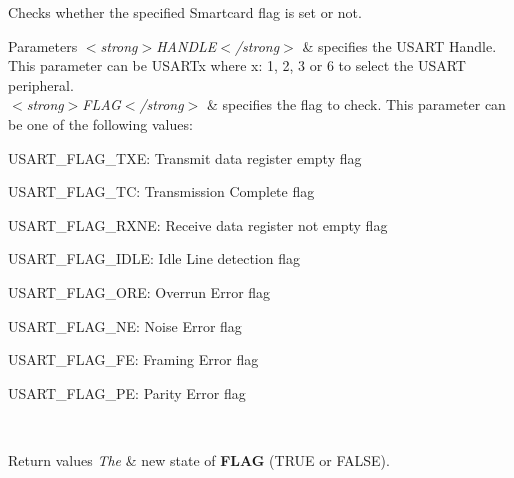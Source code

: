 Checks whether the specified Smartcard flag is set or not. 


\begin{DoxyParams}{Parameters}
{\em $<$strong$>$\+H\+A\+N\+D\+L\+E$<$/strong$>$} & specifies the U\+S\+A\+RT Handle. This parameter can be U\+S\+A\+R\+Tx where x\+: 1, 2, 3 or 6 to select the U\+S\+A\+RT peripheral. \\
\hline
{\em $<$strong$>$\+F\+L\+A\+G$<$/strong$>$} & specifies the flag to check. This parameter can be one of the following values\+: \begin{DoxyItemize}
\item U\+S\+A\+R\+T\+\_\+\+F\+L\+A\+G\+\_\+\+T\+XE\+: Transmit data register empty flag \item U\+S\+A\+R\+T\+\_\+\+F\+L\+A\+G\+\_\+\+TC\+: Transmission Complete flag \item U\+S\+A\+R\+T\+\_\+\+F\+L\+A\+G\+\_\+\+R\+X\+NE\+: Receive data register not empty flag \item U\+S\+A\+R\+T\+\_\+\+F\+L\+A\+G\+\_\+\+I\+D\+LE\+: Idle Line detection flag \item U\+S\+A\+R\+T\+\_\+\+F\+L\+A\+G\+\_\+\+O\+RE\+: Overrun Error flag \item U\+S\+A\+R\+T\+\_\+\+F\+L\+A\+G\+\_\+\+NE\+: Noise Error flag \item U\+S\+A\+R\+T\+\_\+\+F\+L\+A\+G\+\_\+\+FE\+: Framing Error flag \item U\+S\+A\+R\+T\+\_\+\+F\+L\+A\+G\+\_\+\+PE\+: Parity Error flag \end{DoxyItemize}
\\
\hline
\end{DoxyParams}

\begin{DoxyRetVals}{Return values}
{\em The} & new state of {\bfseries F\+L\+AG} (T\+R\+UE or F\+A\+L\+SE). \\
\hline
\end{DoxyRetVals}
